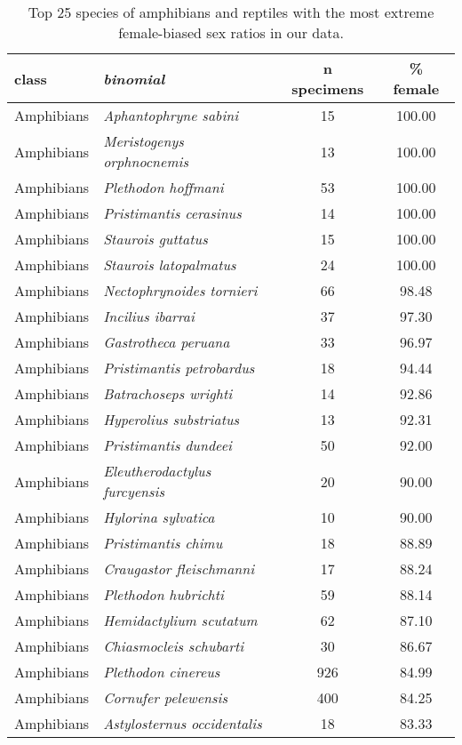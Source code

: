 \begin{longtable}{l>{\itshape}lcc}
\caption{Top 25 species of amphibians and reptiles with the most extreme female-biased sex ratios
                  in our data.} \\ 
  \hline
class & binomial & n specimens & \% female \\ 
  \hline
Amphibians & Aphantophryne sabini &  15 & 100.00 \\ 
  Amphibians & Meristogenys orphnocnemis &  13 & 100.00 \\ 
  Amphibians & Plethodon hoffmani &  53 & 100.00 \\ 
  Amphibians & Pristimantis cerasinus &  14 & 100.00 \\ 
  Amphibians & Staurois guttatus &  15 & 100.00 \\ 
  Amphibians & Staurois latopalmatus &  24 & 100.00 \\ 
  Amphibians & Nectophrynoides tornieri &  66 & 98.48 \\ 
  Amphibians & Incilius ibarrai &  37 & 97.30 \\ 
  Amphibians & Gastrotheca peruana &  33 & 96.97 \\ 
  Amphibians & Pristimantis petrobardus &  18 & 94.44 \\ 
  Amphibians & Batrachoseps wrighti &  14 & 92.86 \\ 
  Amphibians & Hyperolius substriatus &  13 & 92.31 \\ 
  Amphibians & Pristimantis dundeei &  50 & 92.00 \\ 
  Amphibians & Eleutherodactylus furcyensis &  20 & 90.00 \\ 
  Amphibians & Hylorina sylvatica &  10 & 90.00 \\ 
  Amphibians & Pristimantis chimu &  18 & 88.89 \\ 
  Amphibians & Craugastor fleischmanni &  17 & 88.24 \\ 
  Amphibians & Plethodon hubrichti &  59 & 88.14 \\ 
  Amphibians & Hemidactylium scutatum &  62 & 87.10 \\ 
  Amphibians & Chiasmocleis schubarti &  30 & 86.67 \\ 
  Amphibians & Plethodon cinereus & 926 & 84.99 \\ 
  Amphibians & Cornufer pelewensis & 400 & 84.25 \\ 
  Amphibians & Astylosternus occidentalis &  18 & 83.33 \\ 

\end{longtable}
